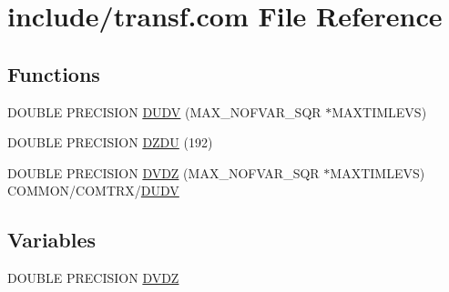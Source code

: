 \hypertarget{transf_8com}{\section{include/transf.com File Reference}
\label{transf_8com}
}
\subsection*{Functions}
\begin{DoxyCompactItemize}
\item 
D\-O\-U\-B\-L\-E P\-R\-E\-C\-I\-S\-I\-O\-N \hyperlink{transf_8com_a8e878d3244ead9471a3061a190818761}{D\-U\-D\-V} (M\-A\-X\-\_\-\-N\-O\-F\-V\-A\-R\-\_\-\-S\-Q\-R $\ast$M\-A\-X\-T\-I\-M\-L\-E\-V\-S)
\item 
D\-O\-U\-B\-L\-E P\-R\-E\-C\-I\-S\-I\-O\-N \hyperlink{transf_8com_aa26787af536504466ab8cf4e2431b763}{D\-Z\-D\-U} (192)
\item 
D\-O\-U\-B\-L\-E P\-R\-E\-C\-I\-S\-I\-O\-N \hyperlink{transf_8com_a9e0bfeb32fc4aec64d9cbee966142e0f}{D\-V\-D\-Z} (M\-A\-X\-\_\-\-N\-O\-F\-V\-A\-R\-\_\-\-S\-Q\-R $\ast$M\-A\-X\-T\-I\-M\-L\-E\-V\-S) C\-O\-M\-M\-O\-N/C\-O\-M\-T\-R\-X/\hyperlink{transf_8com_a8e878d3244ead9471a3061a190818761}{D\-U\-D\-V}
\end{DoxyCompactItemize}
\subsection*{Variables}
\begin{DoxyCompactItemize}
\item 
D\-O\-U\-B\-L\-E P\-R\-E\-C\-I\-S\-I\-O\-N \hyperlink{transf_8com_a429c5f2318702f4852a08f2d450c8a69}{D\-V\-D\-Z}
\end{DoxyCompactItemize}


